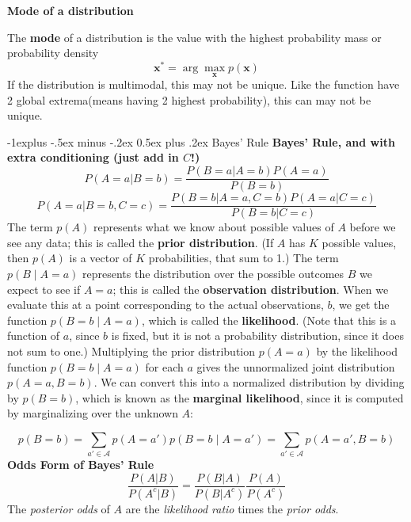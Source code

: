 \documentclass[10pt,landscape]{article}
\makeatletter
\renewcommand{\subsection}{\@startsection{subsection}{2}{0mm}%
                                {-1explus -.5ex minus -.2ex}%
                                {0.5ex plus .2ex}%
                                {\normalfont\normalsize\bfseries}}
\makeatother
\begin{document}
\begin{multicols*}{3}
    \textbf{Mode of a distribution}
   
    The \textbf{mode} of a distribution is the value with the highest probability mass or probability density
    \begin{equation*}
        \mathbf{x^*}= \arg \max_{\mathbf{x}} p(\mathbf{x})
    \end{equation*}
    If the distribution is multimodal, this may not be unique. Like the function have 2 global extrema(means having 2 highest probability), this can may not be unique.

\subsection{Bayes' Rule}    
\textbf{Bayes' Rule, and with extra conditioning (just add in $C$!)}
         \[P({ A=a}|{ B=b})  = \frac{P({ B=a}|{ A=b})P({ A=a})}{P({ B=b})}\]
         \[P({ A=a}|{ B=b}, { C=c}) = \frac{P({ B=b}|{ A=a}, { C=b})P({ A=a} | { C=c})}{P({ B=b} | { C=c})}\]
  The term \( p(A) \) represents what we know about possible values of \( A \) before we see any data; this is called the \textbf{prior distribution}. (If \( A \) has \( K \) possible values, then \( p(A) \) is a vector of \( K \) probabilities, that sum to 1.) The term \( p(B \mid A = a) \) represents the distribution over the possible outcomes \( B \) we expect to see if \( A = a \); this is called the \textbf{observation distribution}. When we evaluate this at a point corresponding to the actual observations, \( b \), we get the function \( p(B = b \mid A = a) \), which is called the \textbf{likelihood}. (Note that this is a function of \( a \), since \( b \) is fixed, but it is not a probability distribution, since it does not sum to one.) Multiplying the prior distribution \( p(A = a) \) by the likelihood function \( p(B = b \mid A = a) \) for each \( a \) gives the unnormalized joint distribution \( p(A = a, B = b) \). We can convert this into a normalized distribution by dividing by \( p(B = b) \), which is known as the \textbf{marginal likelihood}, since it is computed by marginalizing over the unknown \( A \):

\begin{equation*}
    p(B = b) = \sum_{a' \in \mathcal{A}} p(A = a') p(B = b \mid A = a') 
    = \sum_{a' \in \mathcal{A}} p(A = a', B = b)
\end{equation*}
\textbf{Odds Form of Bayes' Rule}
\[\frac{P({ A}| { B})}{P({ A^c}| { B})} = \frac{P({ B}|{ A})}{P({ B}| { A^c})}\frac{P({ A})}{P({ A^c})}\]
The \emph{posterior odds} of $A$ are the \emph{likelihood ratio} times the \emph{prior odds}. 

\end{multicols*}
\end{document}
